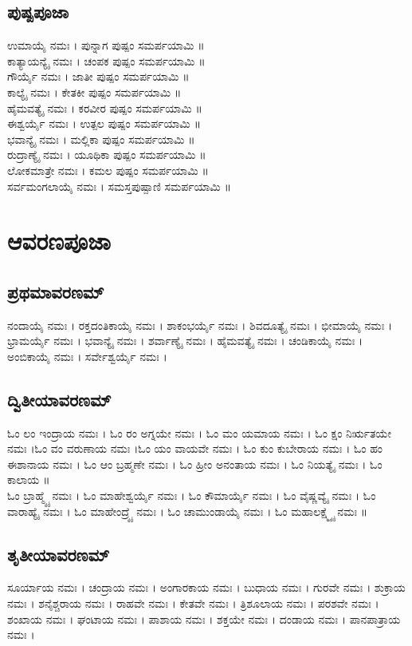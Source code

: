 \subsection{ಪುಷ್ಪಪೂಜಾ}
ಉಮಾಯೈ ನಮಃ । ಪುನ್ನಾಗ ಪುಷ್ಪಂ ಸಮರ್ಪಯಾಮಿ ॥\\
ಕಾತ್ಯಾಯನ್ಯೈ ನಮಃ । ಚಂಪಕ ಪುಷ್ಪಂ ಸಮರ್ಪಯಾಮಿ ॥\\
ಗೌರ್ಯೈ ನಮಃ । ಜಾತೀ ಪುಷ್ಪಂ ಸಮರ್ಪಯಾಮಿ ॥\\
ಕಾಲ್ಯೈ ನಮಃ । ಕೇತಕೀ ಪುಷ್ಪಂ ಸಮರ್ಪಯಾಮಿ ॥\\
ಹೈಮವತ್ಯೈ ನಮಃ । ಕರವೀರ ಪುಷ್ಪಂ ಸಮರ್ಪಯಾಮಿ ॥\\
ಈಶ್ವರ್ಯೈ ನಮಃ । ಉತ್ಪಲ ಪುಷ್ಪಂ ಸಮರ್ಪಯಾಮಿ ॥\\
ಭವಾನ್ಯೈ ನಮಃ । ಮಲ್ಲಿಕಾ ಪುಷ್ಪಂ ಸಮರ್ಪಯಾಮಿ ॥\\
ರುದ್ರಾಣ್ಯೈ ನಮಃ । ಯೂಥಿಕಾ ಪುಷ್ಪಂ ಸಮರ್ಪಯಾಮಿ ॥\\
ಲೋಕಮಾತ್ರೇ ನಮಃ । ಕಮಲ ಪುಷ್ಪಂ ಸಮರ್ಪಯಾಮಿ ॥\\
ಸರ್ವಮಂಗಲಾಯೈ ನಮಃ । ಸಮಸ್ತಪುಷ್ಪಾಣಿ ಸಮರ್ಪಯಾಮಿ ॥
\section{ಆವರಣಪೂಜಾ}
\subsection{ಪ್ರಥಮಾವರಣಮ್}
ನಂದಾಯೈ  ನಮಃ ।
ರಕ್ತದಂತಿಕಾಯೈ  ನಮಃ ।
ಶಾಕಂಭರ್ಯೈ  ನಮಃ ।
ಶಿವದೂತ್ಯೈ  ನಮಃ ।
ಭೀಮಾಯೈ  ನಮಃ ।
ಭ್ರಾಮರ್ಯೈ  ನಮಃ ।
ಭವಾನ್ಯೈ  ನಮಃ ।
ಶರ್ವಾಣ್ಯೈ  ನಮಃ ।
ಹೈಮವತ್ಯೈ  ನಮಃ ।
ಚಂಡಿಕಾಯೈ  ನಮಃ ।
ಅಂಬಿಕಾಯೈ  ನಮಃ ।
ಸರ್ವೇಶ್ವರ್ಯೈ  ನಮಃ ।\\
\newpage
\subsection{ದ್ವಿತೀಯಾವರಣಮ್}
ಓಂ ಲಂ ಇಂದ್ರಾಯ ನಮಃ । ಓಂ ರಂ ಅಗ್ನಯೇ ನಮಃ । ಓಂ ಮಂ ಯಮಾಯ ನಮಃ । ಓಂ ಕ್ಷಂ ನಿರ್ಋತಯೇ ನಮಃ ।ಓಂ ವಂ ವರುಣಾಯ ನಮಃ ।ಓಂ ಯಂ ವಾಯವೇ ನಮಃ । ಓಂ ಕುಂ ಕುಬೇರಾಯ ನಮಃ । ಓಂ ಹಂ ಈಶಾನಾಯ ನಮಃ । ಓಂ ಆಂ ಬ್ರಹ್ಮಣೇ ನಮಃ । ಓಂ ಹ್ರೀಂ ಅನಂತಾಯ ನಮಃ । ಓಂ ನಿಯತ್ಯೈ ನಮಃ । ಓಂ ಕಾಲಾಯ ॥\\
ಓಂ ಬ್ರಾಹ್ಮ್ಯೈ ನಮಃ । ಓಂ ಮಾಹೇಶ್ವರ್ಯೈ ನಮಃ । ಓಂ ಕೌಮಾರ್ಯೈ ನಮಃ । ಓಂ ವೈಷ್ಣವ್ಯೈ ನಮಃ । ಓಂ ವಾರಾಹ್ಯೈ ನಮಃ । ಓಂ ಮಾಹೇಂದ್ರ್ಯೈ ನಮಃ । ಓಂ ಚಾಮುಂಡಾಯೈ ನಮಃ । ಓಂ ಮಹಾಲಕ್ಷ್ಮ್ಯೈ ನಮಃ ॥\\
\subsection{ತೃತೀಯಾವರಣಮ್}
ಸೂರ್ಯಾಯ  ನಮಃ ।
ಚಂದ್ರಾಯ  ನಮಃ ।
ಅಂಗಾರಕಾಯ  ನಮಃ ।
ಬುಧಾಯ  ನಮಃ ।
ಗುರವೇ  ನಮಃ ।
ಶುಕ್ರಾಯ  ನಮಃ ।
ಶನೈಶ್ಚರಾಯ  ನಮಃ ।
ರಾಹವೇ  ನಮಃ ।
ಕೇತವೇ  ನಮಃ ।
ತ್ರಿಶೂಲಾಯ  ನಮಃ ।
ಪರಶವೇ  ನಮಃ ।
ಶಂಖಾಯ  ನಮಃ ।
ಘಂಟಾಯ  ನಮಃ ।
ಪಾಶಾಯ  ನಮಃ ।
ಶಕ್ತಯೇ  ನಮಃ ।
ದಂಡಾಯ  ನಮಃ ।
ಪಾನಪಾತ್ರಾಯ  ನಮಃ ।\\
